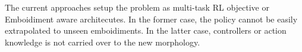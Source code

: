 
The current approaches setup the problem as multi-task RL objective or Emboidiment aware architecutes. 
In the former case, the policy cannot be easily extrapolated to unseen emboidiments. \cite{parakhAnyBodyBenchmarkSuite2025}
In the latter case, controllers or action knowledge is not carried over to the new morphology. \cite{naya-varelaMorphologicalDevelopmentRobotic2021}
